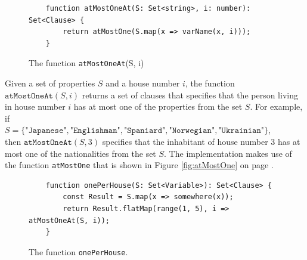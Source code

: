 \begin{figure}[!ht]
\centering
\begin{verbatim}
    function atMostOneAt(S: Set<string>, i: number): Set<Clause> {
        return atMostOne(S.map(x => varName(x, i)));
    }
\end{verbatim}
\vspace*{-0.3cm}
\caption{The function \texttt{atMostOneAt}(S, i)}
\label{fig:atMostOneAt}
\end{figure}

Given a set of properties $S$ and a house number $i$, the function
$\texttt{atMostOneAt}(S, i)$ returns a set of clauses that specifies that the
person living in house number $i$ has at most one of the properties from the set
$S$.  For example, if  
\\[0.2cm]
\hspace*{1.3cm}
$S = \{\texttt{"Japanese"}, \texttt{"Englishman"}, \texttt{"Spaniard"}, \texttt{"Norwegian"}, \texttt{"Ukrainian"}\}$,
\\[0.2cm]
then $\texttt{atMostOneAt}(S, 3)$ specifies that the inhabitant of house number 3
has at most one of the nationalities from the set $S$.   The implementation
makes use of the function \texttt{atMostOne} that is shown in Figure
\ref{fig:atMostOne} on page \pageref{fig:atMostOne}.

\begin{figure}[!ht]
\centering
\begin{verbatim}
    function onePerHouse(S: Set<Variable>): Set<Clause> {
        const Result = S.map(x => somewhere(x));
        return Result.flatMap(range(1, 5), i => atMostOneAt(S, i));
    }
\end{verbatim}
\vspace*{-0.3cm}
\caption{The function \texttt{onePerHouse}.}
\label{fig:onePerHouse}
\end{figure}

